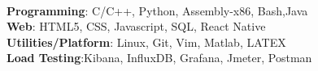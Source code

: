 \ifdefined\ONEPAGE
\\
\textbf{Programming}: C/C++, Python, Assembly-x86, Bash,Java\\
\textbf{Web}: HTML5, CSS, Javascript, SQL, React Native\\
\textbf{Utilities/Platform}: Linux, Git, Vim, Matlab, LATEX \\
\textbf{Load Testing}:Kibana, InfluxDB, Grafana, Jmeter, Postman\\
\else
\fi
